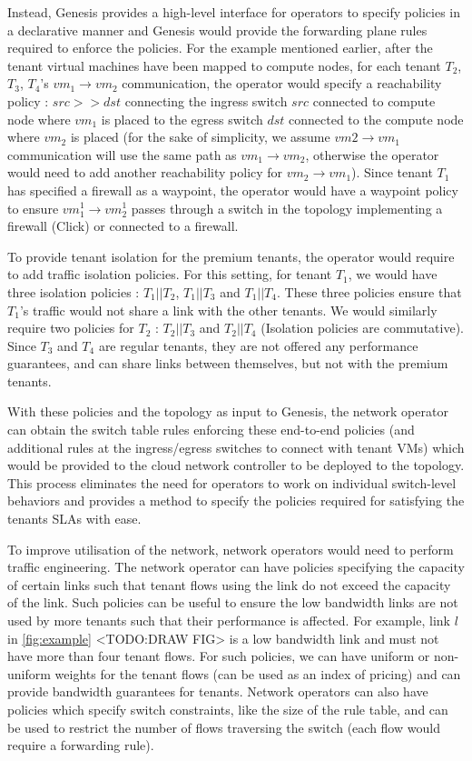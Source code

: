\documentclass[]{sig}
\begin{document}
Instead, Genesis provides a high-level interface for operators to specify policies in a declarative manner and Genesis would provide the forwarding plane rules required to enforce the policies. For the example mentioned earlier, after the tenant virtual machines have been mapped to compute nodes, for each tenant $T_2$, $T_3$, $T_4$'s $vm_1 \rightarrow vm_2$ communication, the operator would specify a reachability policy : $src >> dst$ connecting the ingress switch $src$ connected to compute node where $vm_1$ is placed to the egress switch $dst$ connected to the compute node where $vm_2$ is placed (for the sake of simplicity, we assume $vm2 \rightarrow vm_1$ communication will use the same path as $vm_1 \rightarrow vm_2$, otherwise the operator would need to add another reachability policy for $vm_2 \rightarrow vm_1$). Since tenant $T_1$ has specified a firewall as a waypoint, the operator would have a waypoint policy to ensure $vm^1_1 \rightarrow vm^1_2$ passes through a switch in the topology implementing a firewall (Click) or connected to a firewall. 

To provide tenant isolation for the premium tenants, the operator would require to add traffic isolation policies. For this setting, for tenant $T_1$, we would have three isolation policies : $T_1 || T_2$, $T_1 || T_3$ and $T_1 || T_4$. These three policies ensure that $T_1$'s traffic would not share a link with the other tenants. We would similarly require two policies for $T_2$ : $T_2 || T_3$ and $T_2 || T_4$ (Isolation policies are commutative). Since $T_3$ and $T_4$ are regular tenants, they are not offered any performance guarantees, and can share links between themselves, but not with the premium tenants.  

With these policies and the topology as input to Genesis, the network operator can obtain the switch table rules enforcing these end-to-end policies (and additional rules at the ingress/egress switches to connect with tenant VMs) which would be provided to the cloud network controller to be deployed to the topology. This process eliminates the need for operators to work on individual switch-level behaviors and provides a method to specify the policies required for satisfying the tenants SLAs with ease.   

To improve utilisation of the network, network operators would need to perform traffic engineering. The network operator can have policies specifying the capacity of certain links such that tenant flows using the link do not exceed the capacity of the link. Such policies can be useful to ensure the low bandwidth links are not used by more tenants such that their performance is affected. For example, link $l$ in \cref{fig:example} <TODO:DRAW FIG> is a low bandwidth link and must not have more than four tenant flows. For such policies, we can have uniform or non-uniform weights for the tenant flows (can be used as an index of pricing) and can provide bandwidth guarantees for tenants. Network operators can also have policies which specify switch constraints, like the size of the rule table, and can be used to restrict the number of flows traversing the switch (each flow would require a forwarding rule). 
\end{document}
